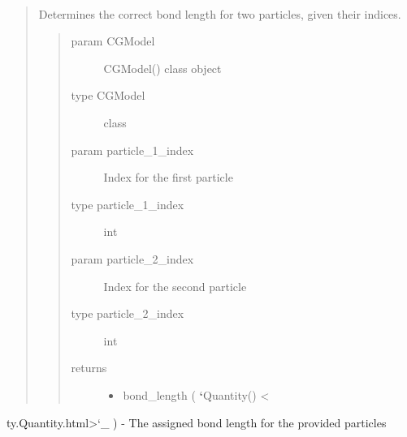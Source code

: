 \documentclass[letterpaper,12pt,english,openany,oneside]{sphinxmanual}
\begin{document}
\begin{fulllineitems}
\begin{fulllineitems}
\label{\detokenize{cg_model:cg_model.cgmodel.CGModel.get_bond_length}}~\begin{quote}

Determines the correct bond length for two particles, given their indices.
\begin{quote}\begin{description}
\item[{param CGModel}] \leavevmode
CGModel() class object

\item[{type CGModel}] \leavevmode
class

\item[{param particle\_1\_index}] \leavevmode
Index for the first particle

\item[{type particle\_1\_index}] \leavevmode
int

\item[{param particle\_2\_index}] \leavevmode
Index for the second particle

\item[{type particle\_2\_index}] \leavevmode
int

\item[{returns}] \leavevmode\begin{itemize}
\item {} 
bond\_length ( {\color{red}\bfseries{}{}`}Quantity() \textless{}

\end{itemize}

\end{description}\end{quote}
\end{quote}

ty.Quantity.html\textgreater{}{}`\_ ) - The assigned bond length for the provided particles

\end{fulllineitems}


\begin{fulllineitems}
\label{\detokenize{cg_model:cg_model.cgmodel.CGModel.get_bond_length_from_names}}~\begin{quote}


\end{quote}
\end{fulllineitems}
\end{fulllineitems}
\end{document}
